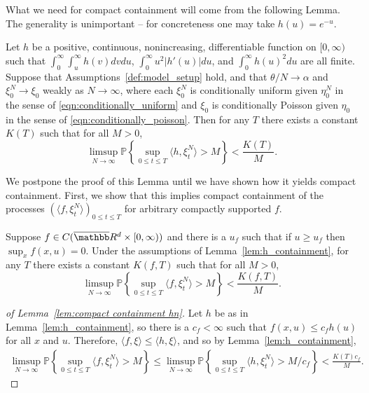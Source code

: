 \documentclass[EJP]{ejpecp} %
\renewcommand{\bar}{\overline}
\newcommand{\IP}{\mathbb P}
\newcommand{\IR}{\mathbb R}
\newcommand{\lp}{\xi}              %
\begin{document}
What we need for compact containment will come from the following Lemma.
The generality is unimportant --
for concreteness one may take $h(u) = e^{-u}$.

\begin{lemma}
        \label{lem:h_containment}
    Let $h$ be a positive, continuous, nonincreasing, differentiable function on $[0, \infty)$
    such that
    $\int_0^\infty \int_u^\infty h(v) dv du$,
    $\int_0^\infty u^2 |h'(u)| du$,
    and $\int_0^\infty h(u)^2 du$
    are all finite.
    Suppose that Assumptions~\ref{def:model_setup} hold,
    and that $\theta/N \to \alpha$ and $\lp_0^N \to \lp_0$ weakly as $N \to \infty$,
    where each $\lp_0^N$ is conditionally uniform given $\eta_0^N$
    in the sense of \eqref{eqn:conditionally_uniform}
    and $\lp_0$ is conditionally Poisson given $\eta_0$
    in the sense of \eqref{eqn:conditionally_poisson}.
    Then for any $T$ there exists a constant $K(T)$ such that for all $M > 0$,
    $$ 
    \limsup_{N \to \infty} \IP\left\{ \sup_{0 \le t \le T} \langle h, \lp^N_t \rangle > M \right\}
    <
    \frac{K(T)}{M} .
    $$
\end{lemma}

We postpone the proof of this Lemma until we have shown how it yields compact containment.
First, we show that this implies compact containment of the processes $(\langle f, \lp^N_t \rangle)_{0 \le t \le T}$
for arbitrary compactly supported $f$.

\begin{lemma}
    \label{lem:compact containment hn}
    Suppose $f \in C(\bar \IR^d \times [0, \infty))$ and there is a $u_f$ such that
    if $u \ge u_f$ then $\sup_x f(x, u) = 0$.
    Under the assumptions of Lemma~\ref{lem:h_containment},
    for any $T$ there exists a constant $K(f,T)$ such that for all $M > 0$,
    $$ 
    \limsup_{N \to \infty} \IP\left\{ \sup_{0 \le t \le T} \langle f, \lp^N_t \rangle > M \right\}
    <
    \frac{K(f,T)}{M} .
    $$
\end{lemma}


\begin{proof}[of Lemma~\ref{lem:compact containment hn}]
    Let $h$ be as in Lemma~\ref{lem:h_containment},
    so there is a $c_f < \infty$ such that $f(x, u) \le c_f h(u)$ for all $x$ and $u$.
    Therefore, $\langle f, \xi \rangle \le \langle h, \xi \rangle$,
    and so by Lemma~\ref{lem:h_containment},
    \begin{align*}
        \limsup_{N \to \infty} \IP\left\{ \sup_{0 \le t \le T} \langle f, \lp^N_t \rangle > M \right\}
        \le
        \limsup_{N \to \infty} \IP\left\{ \sup_{0 \le t \le T} \langle h, \lp^N_t \rangle > M/c_f \right\}
        <
        \frac{K(T) c_f}{M} .
    \end{align*}
\end{proof}
\end{document}
